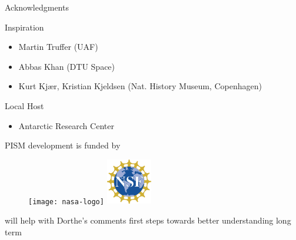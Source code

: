 \documentclass[hide notes,intlimits]{beamer}
\begin{document}
\begin{frame}{Acknowledgments}
  \begin{block}{Inspiration}
    \begin{itemize}
      \item Martin Truffer (UAF)
      \item Abbas Khan (DTU Space)
      \item Kurt Kj{\ae}r, Kristian Kjeldsen (Nat. History Museum, Copenhagen)
    \end{itemize}
  \end{block}
  \begin{block}{Local Host}
    \begin{itemize}
      \item Antarctic Research Center
    \end{itemize}
  \end{block}
  \begin{block}{PISM development is funded by}
    \begin{figure}
      \texttt{[image: nasa-logo]} \hspace{.5em}
      \includegraphics[width=2cm]{NSF-logo-color}
    \end{figure}
  \end{block}
\end{frame}

will help with Dorthe's comments
first steps towards better understanding long term
\end{document}
